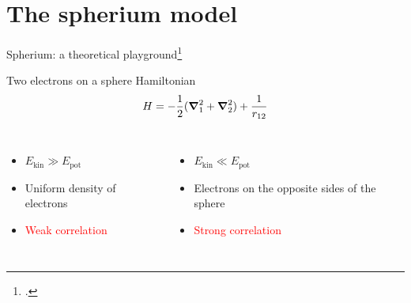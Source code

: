 \documentclass[xcolor=x11names,compress]{beamer}
\renewcommand{\(}{\begin{columns}}
\renewcommand{\)}{\end{columns}}
\newcommand{\<}[1]{\begin{column}{#1}}
\renewcommand{\>}{\end{column}}
\begin{document}
\section{The spherium model}

\begin{frame}{Spherium: a theoretical playground\footcite{loos_ground_2009}}

\begin{beamerboxesrounded}[scheme=foncé]{\centering Two electrons on a sphere Hamiltonian}
\begin{equation*}
    H=-\frac{1}{2}(\grad_1^2 + \grad_2^2) + \frac{1}{r_{12}}
\end{equation*} 
\end{beamerboxesrounded}
\vspace{0.5cm}

\begin{columns}


\vspace{0.5cm}

\begin{itemize}
    \item $E_\text{kin} \gg E_\text{pot}$
    \item Uniform density of electrons
    \item \textcolor{red}{Weak correlation}
\end{itemize}

\vspace{0.5cm}


\vspace{0.5cm}

\begin{itemize}
    \item $E_\text{kin} \ll E_\text{pot}$
    \item Electrons on the opposite sides of the sphere
    \item \textcolor{red}{Strong correlation}
    \end{itemize}

\end{columns}

\end{frame}
\end{document}
